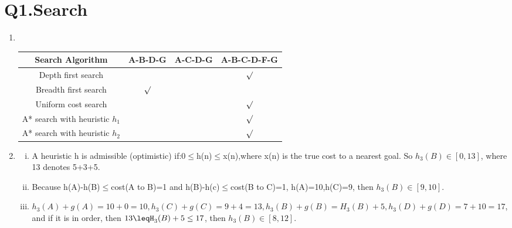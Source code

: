 \documentclass[11pt]{article}
\newenvironment{qparts}{\begin{enumerate}[{(}a{)}]}{\end{enumerate}}
\begin{document}
\section*{Q1.Search}
\begin{qparts}
\item
\\
\begin{center}
\begin{tabular}{|c|c|c|c|}
\hline 
Search Algorithm&A-B-D-G&A-C-D-G&A-B-C-D-F-G\\
\hline 
Depth first search&\ &\ &$\surd$\\
\hline 
Breadth first search&$\surd$&\ &\ \\
\hline
Uniform cost search&\ &\ &$\surd$\\
\hline
A* search with heuristic $h_1$&\ &\ &$\surd$\\
\hline
A* search with heuristic $h_2$&\ &\ &$\surd$\\
\hline
\end{tabular}
\end{center}
\item
\begin{enumerate}[(i)] 
\item
 A heuristic h is admissible (optimistic) if:0$\leq$h(n)$\leq$x(n),where x(n) is the true cost to a nearest goal. So  $h_3(B) \in [0,13]$, where 13 denotes 5+3+5.
\item
Because h(A)-h(B)$\leq$cost(A to B)=1 and h(B)-h(c)$\leq$cost(B to C)=1, h(A)=10,h(C)=9, then $h_3(B) \in [9,10]$.
\item
$h_{3}(A)+g(A)=10+0=10,h_{3}(C)+g(C)=9+4=13,h_{3}(B)+g(B)=H_{3}(B)+5,h_{3}(D)+g(D)=7+10=17$, and if it is in order, then $13\leqH_{3}(B)+5\leq17$, then $h_3(B) \in [8,12]$.
\end{enumerate}
\newpage
\end{qparts}
\end{document}

